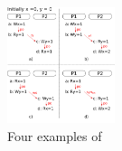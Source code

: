 \begin{figure}[t]
  \centering
  \includegraphics[width=0.28\textwidth]{1_figures/synpat-examples.pdf} 
  \caption{Four examples of \synpats}
  \label{fig:synpat}
\end{figure}